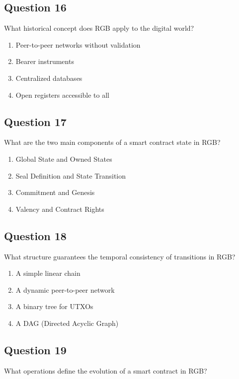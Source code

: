\documentclass[12pt,a4paper]{article}
\begin{document}
\bigskip


\subsection*{Question 16}
What historical concept does RGB apply to the digital world?

\begin{enumerate}[label=\Alph*., leftmargin=*]
\item Peer-to-peer networks without validation
\item Bearer instruments
\item Centralized databases
\item Open registers accessible to all
\end{enumerate}

\bigskip


\subsection*{Question 17}
What are the two main components of a smart contract state in RGB?

\begin{enumerate}[label=\Alph*., leftmargin=*]
\item Global State and Owned States
\item Seal Definition and State Transition
\item Commitment and Genesis
\item Valency and Contract Rights
\end{enumerate}

\bigskip


\subsection*{Question 18}
What structure guarantees the temporal consistency of transitions in RGB?

\begin{enumerate}[label=\Alph*., leftmargin=*]
\item A simple linear chain
\item A dynamic peer-to-peer network
\item A binary tree for UTXOs
\item A DAG (Directed Acyclic Graph)
\end{enumerate}

\bigskip


\subsection*{Question 19}
What operations define the evolution of a smart contract in RGB?
\end{document}
